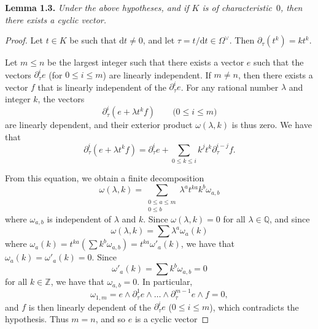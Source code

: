 \documentclass{report}
\newenvironment{itenv}[1]
  {\phantomsection\par\medskip\noindent\textbf{#1.}\itshape}
  {\medskip}
\newcommand{\QQ}{\mathbb{Q}}
\newcommand{\ZZ}{\mathbb{Z}}
\newcommand{\dd}{\mathrm{d}}
\renewcommand{\leq}{\leqslant}
\newcommand{\oldpage}[1]{\marginpar{\footnotesize$\Big\vert$ \textit{p.~#1}}}
\begin{document}
\begin{itenv}{Lemma 1.3}
\label{II.1.3}
  Under the above hypotheses, and if $K$ is of characteristic~$0$, then there exists a cyclic vector.
\end{itenv}

\begin{proof}
  Let $t\in K$ be such that $\dd t\neq0$, and let $\tau=t/\dd t\in\Omega^\vee$.
  Then $\partial_\tau(t^k)=kt^k$.

  Let $m\leq n$ be the largest integer such that there exists a vector $e$ such that the vectors $\partial_\tau^i e$ (for $0\leq i\leq m$) are linearly independent.
  If $m\neq n$, then there exists a vector $f$ that is linearly independent of the $\partial_\tau^i e$.
  For any rational number $\lambda$ and integer $k$, the vectors
  \[
    \partial_\tau^i(e+\lambda t^k f)
    \qquad\mbox{($0\leq i\leq m$)}
  \]
  are linearly dependent, and their exterior product $\omega(\lambda,k)$ is thus zero.
  We have that
  \[
    \partial_\tau^i(e+\lambda t^k f)
    = \partial_\tau^i e + \sum_{0\leq k\leq i} k^j t^k \partial_\tau^{i-j} f.
  \]

  From this equation, we obtain a finite decomposition
  \[
    \omega(\lambda,k)
    = \sum_{\substack{0\leq a\leq m\\0\leq b}} \lambda^a t^{ka} k^b \omega_{a,b}
  \]
\oldpage{43}
  where $\omega_{a,b}$ is independent of $\lambda$ and $k$.
  Since $\omega(\lambda,k)=0$ for all $\lambda\in\QQ$, and since
  \[
    \omega(\lambda,k) = \sum \lambda^a \omega_a(k)
  \]
  where $\omega_a(k) = t^{ka}(\sum k^b \omega_{a,b}) = t^{ka} \omega'_a(k)$, we have that $\omega_a(k) = \omega'_a(k) = 0$.
  Since
  \[
    \omega'_a(k) = \sum k^b \omega_{a,b} = 0
  \]
  for all $k\in\ZZ$, we have that $\omega_{a,b}=0$.
  In particular,
  \[
    \omega_{1,m}
    = e\wedge\partial_\tau^1 e\wedge\ldots\wedge\partial_\tau^{m-1} e\wedge f
    = 0,
  \]
  and $f$ is then linearly dependent of the $\partial_\tau^i e$ ($0\leq i\leq m$), which contradicts the hypothesis.
  Thus $m=n$, and so $e$ is a cyclic vector
\end{proof}
\end{document}
